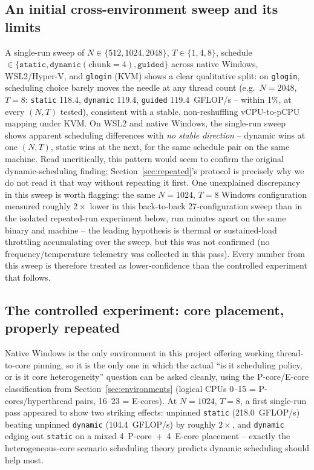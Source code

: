 \documentclass[acmsmall]{acmart}
\begin{document}
\subsection{An initial cross-environment sweep and its limits}
A single-run sweep of $N\in\{512,1024,2048\}$, $T\in\{1,4,8\}$, schedule
$\in\{\texttt{static},\texttt{dynamic}(\text{chunk}{=}4),\texttt{guided}\}$
across native Windows, WSL2/Hyper-V, and \texttt{glogin} (KVM) shows a
clear qualitative split: on \texttt{glogin}, scheduling choice barely
moves the needle at any thread count (e.g.\ $N{=}2048$, $T{=}8$:
\texttt{static} 118.4, \texttt{dynamic} 119.4, \texttt{guided}
119.4~GFLOP/s -- within 1\%, at every $(N,T)$ tested), consistent with a
stable, non-reshuffling vCPU-to-pCPU mapping under KVM. On WSL2 and
native Windows, the single-run sweep shows apparent scheduling
differences with \emph{no stable direction} -- dynamic wins at one
$(N,T)$, static wins at the next, for the same schedule pair on the
same machine. Read uncritically, this pattern would seem to confirm the
original dynamic-scheduling finding; Section~\ref{sec:repeated}'s
protocol is precisely why we do not read it that way without repeating
it first. One unexplained discrepancy in this sweep is worth flagging:
the same $N{=}1024$, $T{=}8$ Windows
configuration measured roughly $2\times$ lower in this back-to-back
27-configuration sweep than in the isolated repeated-run experiment
below, run minutes apart on the same binary and machine -- the leading
hypothesis is thermal or sustained-load throttling accumulating over
the sweep, but this was not confirmed (no frequency/temperature
telemetry was collected in this pass). Every number from this sweep is
therefore treated as lower-confidence than the controlled experiment
that follows.

\subsection{The controlled experiment: core placement, properly repeated}
\label{sec:vmcase-repeat}
Native Windows is the only environment in this project offering working
thread-to-core pinning, so it is the only one in which the actual
``is it scheduling policy, or is it core heterogeneity'' question can be
asked cleanly, using the P-core/E-core classification from
Section~\ref{sec:environments} (logical CPUs 0--15 = P-cores/hyperthread
pairs, 16--23 = E-cores). At $N{=}1024$, $T{=}8$, a first single-run
pass appeared to show two striking effects: unpinned \texttt{static}
(218.0~GFLOP/s) beating unpinned \texttt{dynamic} (104.4~GFLOP/s) by
roughly $2\times$, and \texttt{dynamic} edging out \texttt{static} on a
mixed 4~P-core~+~4~E-core placement -- exactly the heterogeneous-core
scenario scheduling theory predicts dynamic scheduling should help most.
\end{document}
